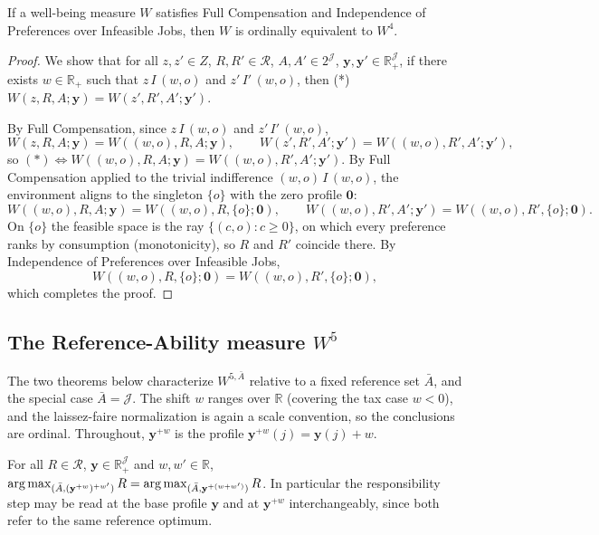 \begin{theorem}[$W^4$]
\label{thm:w4}
If a well-being measure $W$ satisfies Full Compensation and Independence of
Preferences over Infeasible Jobs, then $W$ is ordinally equivalent to $W^4$.
\end{theorem}

\begin{proof}
We show that for all $z,z'\in Z$, $R,R'\in\mathcal R$, $A,A'\in 2^{\mathcal J}$,
$\mathbf y,\mathbf y'\in\mathbb R_+^{\mathcal J}$, if there exists
$w\in\mathbb R_+$ such that $z\,I\,(w,o)$ and $z'\,I'\,(w,o)$, then (*)
$W(z,R,A;\mathbf y)=W(z',R',A';\mathbf y')$.

By Full Compensation, since $z\,I\,(w,o)$ and $z'\,I'\,(w,o)$,
\begin{equation*}
W(z,R,A;\mathbf y)=W((w,o),R,A;\mathbf y),\qquad
W(z',R',A';\mathbf y')=W((w,o),R',A';\mathbf y'),
\end{equation*}
so $(*)\Leftrightarrow W((w,o),R,A;\mathbf y)=W((w,o),R',A';\mathbf y')$. By
Full Compensation applied to the trivial indifference $(w,o)\,I\,(w,o)$, the
environment aligns to the singleton $\{o\}$ with the zero profile $\mathbf 0$:
\begin{equation*}
W((w,o),R,A;\mathbf y)=W((w,o),R,\{o\};\mathbf 0),\qquad
W((w,o),R',A';\mathbf y')=W((w,o),R',\{o\};\mathbf 0).
\end{equation*}
On $\{o\}$ the feasible space is the ray $\{(c,o):c\geq 0\}$, on which every
preference ranks by consumption (monotonicity), so $R$ and $R'$ coincide there.
By Independence of Preferences over Infeasible Jobs,
\begin{equation*}
W((w,o),R,\{o\};\mathbf 0)=W((w,o),R',\{o\};\mathbf 0),
\end{equation*}
which completes the proof.
\end{proof}

\subsection{The Reference-Ability measure $W^5$}

The two theorems below characterize $W^{5,\bar A}$ relative to a fixed reference
set $\bar A$, and the special case $\bar A=\mathcal J$. The shift $w$ ranges
over $\mathbb R$ (covering the tax case $w<0$), and the laissez-faire
normalization is again a scale convention, so the conclusions are ordinal.
Throughout, $\mathbf y^{+w}$ is the profile $\mathbf y^{+w}(j)=\mathbf y(j)+w$.

\begin{lemma}
\label{lem:w5shift}
For all $R\in\mathcal R$, $\mathbf y\in\mathbb R_+^{\mathcal J}$ and
$w,w'\in\mathbb R$,
$\operatorname*{arg\,max}_{(\bar A,(\mathbf y^{+w})^{+w'})}R=\operatorname*{arg\,max}_{(\bar A,\mathbf
y^{+(w+w')})}R$. In particular the responsibility step may be read at the base
profile $\mathbf y$ and at $\mathbf y^{+w}$ interchangeably, since both refer to
the same reference optimum.
\end{lemma}

